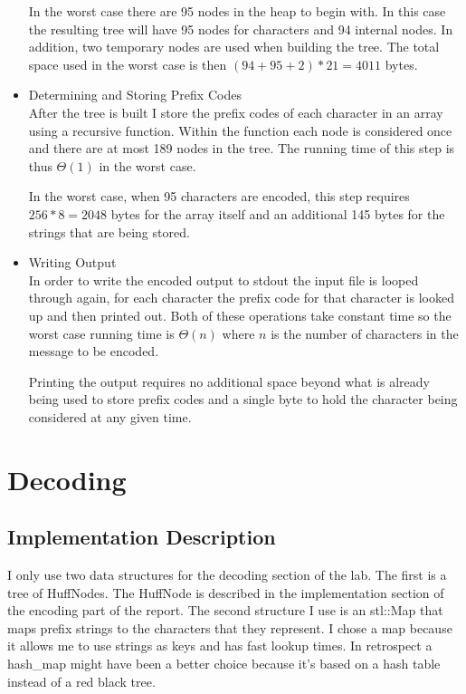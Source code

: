 \documentclass{article}
\begin{document}
\begin{itemize}
        In the worst case there are 95 nodes in the heap to begin with. In this case the resulting tree will have 95 nodes for characters and 94 internal nodes. In addition, two temporary nodes are used when building the tree. The total space used in the worst case is then $(94 + 95 + 2)*21 = 4011$ bytes.
        
    \item Determining and Storing Prefix Codes\\
        After the tree is built I store the prefix codes of each character in an array using a recursive function. Within the function each node is considered once and there are at most 189 nodes in the tree. The running time of this step is thus $\Theta(1)$ in the worst case.

        In the worst case, when 95 characters are encoded, this step requires $256*8 = 2048$ bytes for the array itself and an additional 145 bytes for the strings that are being stored.

    \item Writing Output\\
        In order to write the encoded output to stdout the input file is looped through again, for each character the prefix code for that character is looked up and then printed out. Both of these operations take constant time so the worst case running time is $\Theta(n)$ where $n$ is the number of characters in the message to be encoded.

        Printing the output requires no additional space beyond what is already being used to store prefix codes and a single byte to hold the character being considered at any given time.
\end{itemize}

\section{Decoding}
\subsection{Implementation Description}
I only use two data structures for the decoding section of the lab. The first is a tree of HuffNodes. The HuffNode is described in the implementation section of the encoding part of the report. The second structure I use is an stl::Map that maps prefix strings to the characters that they represent. I chose a map because it allows me to use strings as keys and has fast lookup times. In retrospect a hash\_map might have been a better choice because it's based on a hash table instead of a red black tree. 
\end{document}
